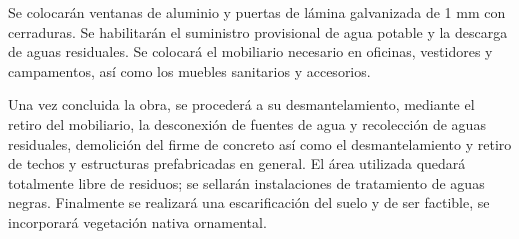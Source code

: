 \documentclass{article}
\begin{document}
\bigskip

Se colocarán ventanas de aluminio y puertas de lámina galvanizada de 1 mm con cerraduras. Se habilitarán el suministro provisional de agua potable y la descarga de aguas residuales. Se colocará el mobiliario necesario en oficinas, vestidores y campamentos, así como los muebles sanitarios y accesorios.


\bigskip

Una vez concluida la obra, se procederá a su desmantelamiento, mediante el retiro del mobiliario, la desconexión de fuentes de agua y recolección de aguas residuales, demolición del firme de concreto así como el desmantelamiento y retiro de techos y estructuras prefabricadas en general. El área utilizada quedará totalmente libre de residuos; se sellarán instalaciones de tratamiento de aguas negras. Finalmente se realizará una escarificación del suelo y de ser factible, se incorporará vegetación nativa ornamental.


\bigskip
\end{document}
